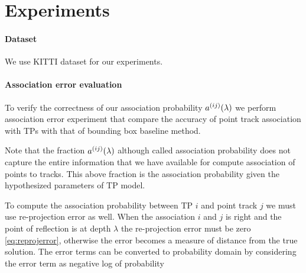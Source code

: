 \section{Experiments}
\label{sec:experiments}


\paragraph{Dataset} We use KITTI dataset for our experiments.  \cite{geiger2013vision}


\paragraph{Association error evaluation}

To verify the correctness of our association probability $a^{(ij)}(\lambda)$ we perform
association error experiment that compare the accuracy of point track
association with TPs with that of bounding box baseline method.

% 

Note that the fraction $a^{(ij)}(\lambda)$ although called association probability does
not capture the entire information that we have available for compute
association of points to tracks. This above fraction is the association
probability given the hypothesized parameters of TP model. 

To compute the association probability between TP $i$ and
point track $j$ we must use re-projection error as well. When the association
$i$ and $j$ is right and the point of reflection is at depth $\lambda$ the
re-projection error must be zero \eqref{eq:reprojerror}, otherwise the error
becomes a measure of distance from the true solution.
The error terms can be converted to probability domain by considering the error
term as negative log of probability

